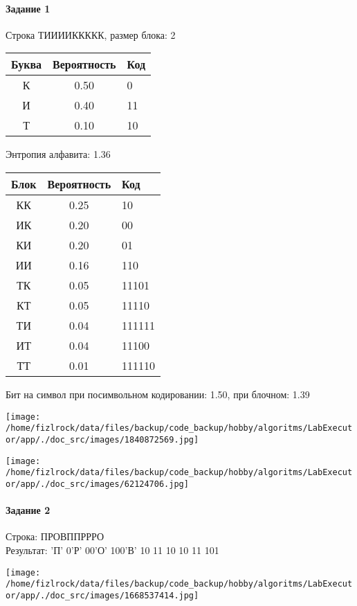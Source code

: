 \documentclass[a4paper, 12pt]{article}
\begin{document}
\paragraph{Задание 1}

Строка ТИИИИККККК, размер блока: 2
\begin{center}
 \begin{tabular}{ |c|c|l| } 
  \hline
     Буква & Вероятность & Код\\ \hline
К & 0.50 & 0\\\hline
И & 0.40 & 11\\\hline
Т & 0.10 & 10
\\ \hline \end{tabular}
\end{center}
Энтропия алфавита: 1.36
\begin{center}
 \begin{tabular}{ |c|c|l| } 
  \hline
     Блок & Вероятность & Код\\ \hline
КК & 0.25 & 10\\\hline
ИК & 0.20 & 00\\\hline
КИ & 0.20 & 01\\\hline
ИИ & 0.16 & 110\\\hline
ТК & 0.05 & 11101\\\hline
КТ & 0.05 & 11110\\\hline
ТИ & 0.04 & 111111\\\hline
ИТ & 0.04 & 11100\\\hline
ТТ & 0.01 & 111110
\\ \hline \end{tabular}
\end{center}
Бит на символ при посимвольном кодировании: 1.50, при блочном: 1.39

\texttt{[image: /home/fizlrock/data/files/backup/code\_backup/hobby/algoritms/LabExecutor/app/./doc\_src/images/1840872569.jpg]}

\texttt{[image: /home/fizlrock/data/files/backup/code\_backup/hobby/algoritms/LabExecutor/app/./doc\_src/images/62124706.jpg]}
\pagebreak
\paragraph{Задание 2}

Строка: 
ПРОВППРРРО\\
Результат: 'П' 0'Р' 00'О' 100'В' 10 11 10 10 11 101

\texttt{[image: /home/fizlrock/data/files/backup/code\_backup/hobby/algoritms/LabExecutor/app/./doc\_src/images/1668537414.jpg]}
\end{document}
